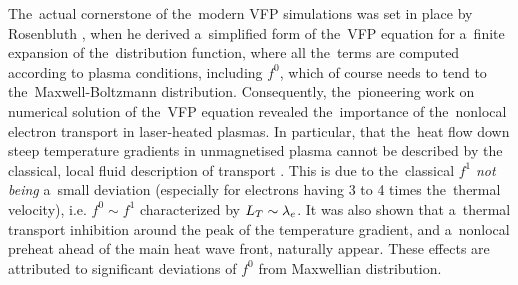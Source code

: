 The~actual cornerstone of the~modern VFP simulations was set in place
by Rosenbluth \cite{Rosenbluth_PR1957}, when he derived a~simplified form 
of the~VFP equation for a~finite expansion of the~distribution function,
where all the~terms are computed according to plasma conditions, including
$f^0$, which of course needs to tend to the~Maxwell-Boltzmann distribution.
Consequently, the~pioneering work on numerical solution of the~VFP equation
\cite{Bell_1981_83, Matte_1982_86} revealed the~importance of the~nonlocal
electron transport in laser-heated plasmas. 
In particular, that the~heat flow down steep temperature gradients in 
unmagnetised plasma cannot be described by the classical, local fluid
description of transport \cite{SpitzerHarm_PR1953, Braginskii_1965_3}.
This is due to the~classical $f^1$ \textit{not being} a~small deviation 
(especially for electrons having 3 to 4 times the~thermal velocity), 
i.e. $f^0\sim f^1$ characterized by $L_T\sim\lambda_e$.
It was also shown that a~thermal transport inhibition \cite{Bell_1981_83} 
around the peak of the temperature gradient, and a~nonlocal preheat 
ahead of the main heat wave front, naturally appear. 
These effects are attributed to significant deviations 
of $f^0$ from Maxwellian distribution.




